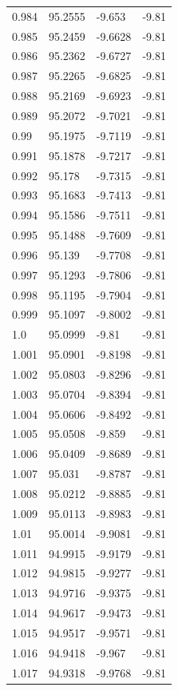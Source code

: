 \begin{tabular}{llll}
0.984 & 95.2555 & -9.653 & -9.81 \\
0.985 & 95.2459 & -9.6628 & -9.81 \\
0.986 & 95.2362 & -9.6727 & -9.81 \\
0.987 & 95.2265 & -9.6825 & -9.81 \\
0.988 & 95.2169 & -9.6923 & -9.81 \\
0.989 & 95.2072 & -9.7021 & -9.81 \\
0.99 & 95.1975 & -9.7119 & -9.81 \\
0.991 & 95.1878 & -9.7217 & -9.81 \\
0.992 & 95.178 & -9.7315 & -9.81 \\
0.993 & 95.1683 & -9.7413 & -9.81 \\
0.994 & 95.1586 & -9.7511 & -9.81 \\
0.995 & 95.1488 & -9.7609 & -9.81 \\
0.996 & 95.139 & -9.7708 & -9.81 \\
0.997 & 95.1293 & -9.7806 & -9.81 \\
0.998 & 95.1195 & -9.7904 & -9.81 \\
0.999 & 95.1097 & -9.8002 & -9.81 \\
1.0 & 95.0999 & -9.81 & -9.81 \\
1.001 & 95.0901 & -9.8198 & -9.81 \\
1.002 & 95.0803 & -9.8296 & -9.81 \\
1.003 & 95.0704 & -9.8394 & -9.81 \\
1.004 & 95.0606 & -9.8492 & -9.81 \\
1.005 & 95.0508 & -9.859 & -9.81 \\
1.006 & 95.0409 & -9.8689 & -9.81 \\
1.007 & 95.031 & -9.8787 & -9.81 \\
1.008 & 95.0212 & -9.8885 & -9.81 \\
1.009 & 95.0113 & -9.8983 & -9.81 \\
1.01 & 95.0014 & -9.9081 & -9.81 \\
1.011 & 94.9915 & -9.9179 & -9.81 \\
1.012 & 94.9815 & -9.9277 & -9.81 \\
1.013 & 94.9716 & -9.9375 & -9.81 \\
1.014 & 94.9617 & -9.9473 & -9.81 \\
1.015 & 94.9517 & -9.9571 & -9.81 \\
1.016 & 94.9418 & -9.967 & -9.81 \\
1.017 & 94.9318 & -9.9768 & -9.81 \\

\end{tabular}
